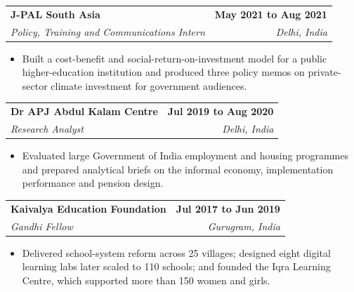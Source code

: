 \documentclass[10pt,a4paper]{article}
\makeatletter
\newcommand{\entry}[4]{%
  \begin{tabularx}{\textwidth}{@{}X r@{}}
    \textbf{#1} & \textbf{#2} \\
    \textit{#3} & \textit{#4}
  \end{tabularx}\vspace{-2pt}
}
\makeatother
\begin{document}
\entry{J-PAL South Asia}{May 2021 to Aug 2021}{Policy, Training and Communications Intern}{Delhi, India}
\begin{itemize}
  \item Built a cost-benefit and social-return-on-investment model for a public higher-education institution and produced three policy memos on private-sector climate investment for government audiences.
\end{itemize}

\entry{Dr APJ Abdul Kalam Centre}{Jul 2019 to Aug 2020}{Research Analyst}{Delhi, India}
\begin{itemize}
  \item Evaluated large Government of India employment and housing programmes and prepared analytical briefs on the informal economy, implementation performance and pension design.
\end{itemize}

\entry{Kaivalya Education Foundation}{Jul 2017 to Jun 2019}{Gandhi Fellow}{Gurugram, India}
\begin{itemize}
  \item Delivered school-system reform across 25 villages; designed eight digital learning labs later scaled to 110 schools; and founded the Iqra Learning Centre, which supported more than 150 women and girls.
\end{itemize}

\newpage
\end{document}
